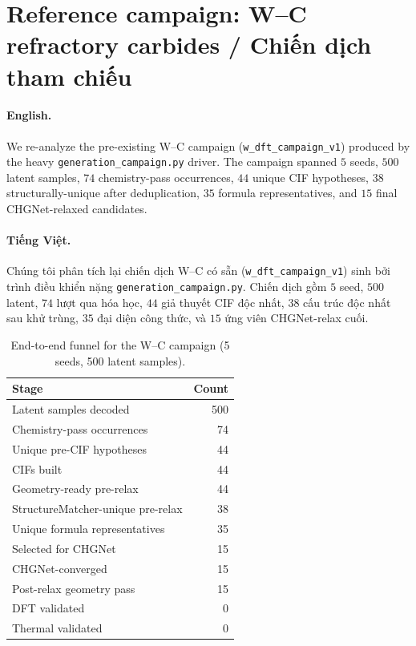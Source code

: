 \documentclass[11pt,a4paper]{report}
\begin{document}
\section{Reference campaign: W--C refractory carbides / Chiến dịch tham chiếu}

\paragraph{English.}
We re-analyze the pre-existing W--C campaign
(\texttt{w\_dft\_campaign\_v1}) produced by the heavy \texttt{generation\_campaign.py}
driver. The campaign spanned $5$ seeds, $500$ latent samples, $74$ chemistry-pass occurrences,
$44$ unique CIF hypotheses, $38$ structurally-unique after deduplication, $35$ formula
representatives, and $15$ final CHGNet-relaxed candidates.

\paragraph{Tiếng Việt.}
Chúng tôi phân tích lại chiến dịch W--C có sẵn (\texttt{w\_dft\_campaign\_v1}) sinh bởi trình
điều khiển nặng \texttt{generation\_campaign.py}. Chiến dịch gồm $5$ seed, $500$ latent,
$74$ lượt qua hóa học, $44$ giả thuyết CIF độc nhất, $38$ cấu trúc độc nhất sau khử trùng,
$35$ đại diện công thức, và $15$ ứng viên CHGNet-relax cuối.

\begin{table}[h]
\centering
\caption{End-to-end funnel for the W--C campaign (5 seeds, 500 latent samples).}
\label{tab:funnel}
\begin{tabular}{lr}
\toprule
\textbf{Stage} & \textbf{Count} \\
\midrule
Latent samples decoded & 500 \\
Chemistry-pass occurrences & 74 \\
Unique pre-CIF hypotheses & 44 \\
CIFs built & 44 \\
Geometry-ready pre-relax & 44 \\
StructureMatcher-unique pre-relax & 38 \\
Unique formula representatives & 35 \\
Selected for CHGNet & 15 \\
CHGNet-converged & 15 \\
Post-relax geometry pass & 15 \\
\midrule
DFT validated & 0 \\
Thermal validated & 0 \\
\bottomrule
\end{tabular}
\end{table}
\end{document}
